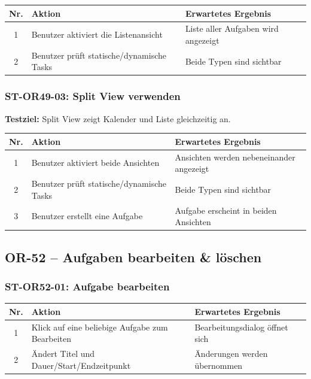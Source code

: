 \documentclass[a4paper,11pt]{article}
\begin{document}
\begin{longtable}{cp{5.5cm}p{5.5cm}}
    \toprule
    \textbf{Nr.} & \textbf{Aktion} & \textbf{Erwartetes Ergebnis} \\
    \midrule
    1 & Benutzer aktiviert die Listenansicht & Liste aller Aufgaben wird angezeigt \\
    2 & Benutzer prüft statische/dynamische Tasks & Beide Typen sind sichtbar \\
    \bottomrule
\end{longtable}

\subsubsection*{ST-OR49-03: Split View verwenden}
\textbf{Testziel:} Split View zeigt Kalender und Liste gleichzeitig an.

\begin{longtable}{cp{5.5cm}p{5.5cm}}
    \toprule
    \textbf{Nr.} & \textbf{Aktion} & \textbf{Erwartetes Ergebnis} \\
    \midrule
    1 & Benutzer aktiviert beide Ansichten & Ansichten werden nebeneinander angezeigt \\
    2 & Benutzer prüft statische/dynamische Tasks & Beide Typen sind sichtbar \\
    3 & Benutzer erstellt eine Aufgabe & Aufgabe erscheint in beiden Ansichten \\
    \bottomrule
\end{longtable}

\subsection{OR-52 -- Aufgaben bearbeiten \& löschen}

\subsubsection*{ST-OR52-01: Aufgabe bearbeiten}
\begin{longtable}{cp{5.5cm}p{5.5cm}}
    \toprule
    \textbf{Nr.} & \textbf{Aktion} & \textbf{Erwartetes Ergebnis} \\
    \midrule
    1 & Klick auf eine beliebige Aufgabe zum Bearbeiten & Bearbeitungsdialog öffnet sich \\
    2 & Ändert Titel und Dauer/Start/Endzeitpunkt & Änderungen werden übernommen \\
    \bottomrule
\end{longtable}
\end{document}
